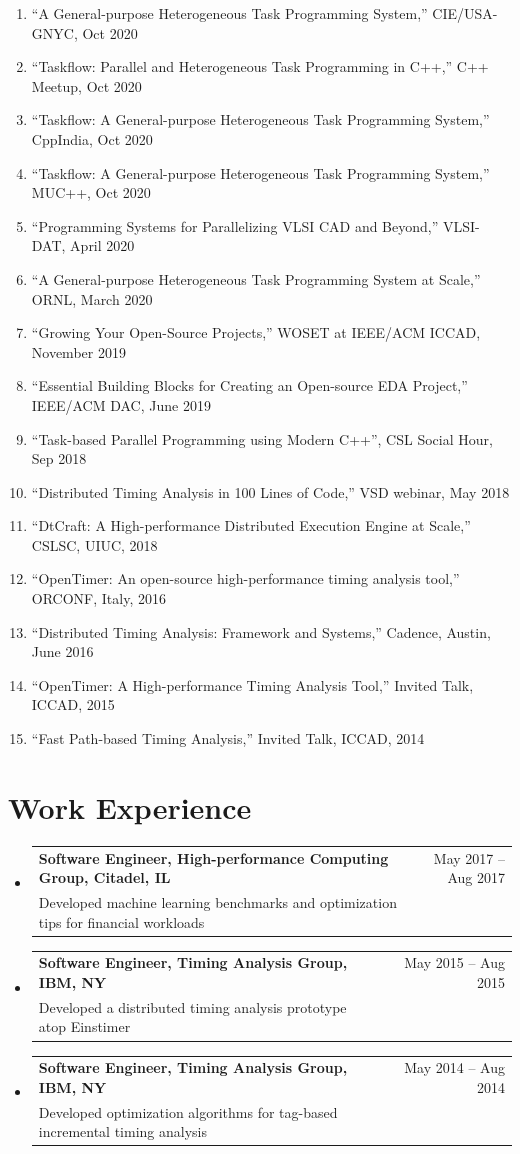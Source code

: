 \documentclass[A4,11pt]{article}
\makeatletter
\newcommand{\CVSubheading}[4]{
  \vspace{-2pt}\item
    \begin{tabular*}{0.97\textwidth}[t]{l@{\extracolsep{\fill}}r}
      \textbf{#1} & #2 \\
      \small#3 & \small #4 \\
    \end{tabular*}\vspace{-7pt}
}
\newcommand{\CVSubHeadingListStart}{\begin{itemize}[leftmargin=0.5cm, label={}]}
\newcommand{\CVSubHeadingListEnd}{\end{itemize}}
\makeatother
\begin{document}
\begin{enumerate}
  \item ``A General-purpose Heterogeneous Task Programming System,'' CIE/USA-GNYC, Oct 2020
  \item ``Taskflow: Parallel and Heterogeneous Task Programming in C++,'' C++ Meetup, Oct 2020
  \item ``Taskflow: A General-purpose Heterogeneous Task Programming System,'' CppIndia, Oct 2020
  \item ``Taskflow: A General-purpose Heterogeneous Task Programming System,'' MUC++, Oct 2020
  \item ``Programming Systems for Parallelizing VLSI CAD and Beyond,'' VLSI-DAT, April 2020
  \item ``A General-purpose Heterogeneous Task Programming System at Scale,'' ORNL, March 2020
  \item ``Growing Your Open-Source Projects,'' WOSET at IEEE/ACM ICCAD, November 2019
  \item ``Essential Building Blocks for Creating an Open-source EDA Project,'' IEEE/ACM DAC, June 2019
  \item ``Task-based Parallel Programming using Modern C++'', CSL Social Hour, Sep 2018
  \item ``Distributed Timing Analysis in 100 Lines of Code,'' VSD webinar, May 2018
  \item ``DtCraft: A High-performance Distributed Execution Engine at Scale,'' CSLSC, UIUC, 2018
  \item ``OpenTimer: An open-source high-performance timing analysis tool,'' ORCONF, Italy, 2016
  \item ``Distributed Timing Analysis: Framework and Systems,'' Cadence, Austin, June 2016
  \item ``OpenTimer: A High-performance Timing Analysis Tool,'' Invited Talk, ICCAD, 2015
  \item ``Fast Path-based Timing Analysis,'' Invited Talk, ICCAD, 2014

 \end{enumerate}

\section{Work Experience}
  \CVSubHeadingListStart
    \CVSubheading
      {{Software Engineer, High-performance Computing Group, Citadel, IL}}{May 2017 -- Aug 2017}
      {Developed machine learning benchmarks and optimization tips for financial workloads}{}
    \CVSubheading
      {{Software Engineer, Timing Analysis Group, IBM, NY}}{May 2015 -- Aug 2015}
      {Developed a distributed timing analysis prototype atop Einstimer}{}
    \CVSubheading
      {{Software Engineer, Timing Analysis Group, IBM, NY}}{May 2014 -- Aug 2014}
      {Developed optimization algorithms for tag-based incremental timing analysis}{}
  \CVSubHeadingListEnd
    
\end{document}
